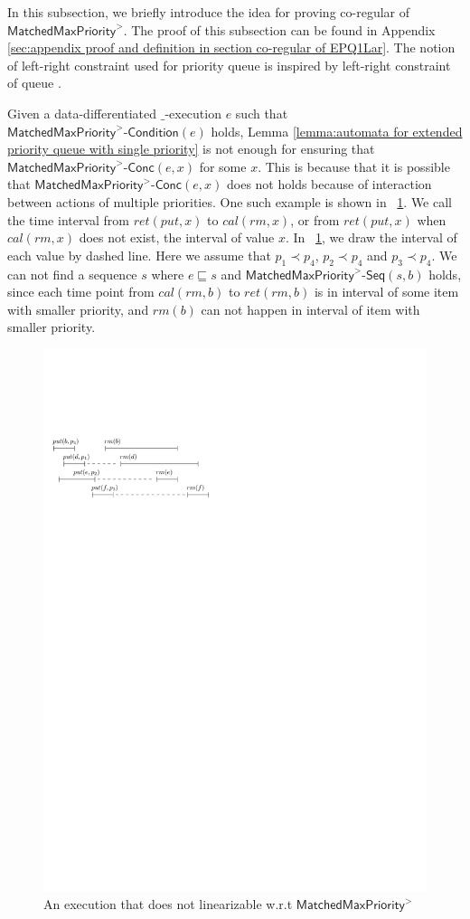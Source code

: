 In this subsection, we briefly introduce the idea for proving co-regular of $\mathsf{MatchedMaxPriority}^{>}$. The proof of this subsection can be found in Appendix \ref{sec:appendix proof and definition in section co-regular of EPQ1Lar}. The notion of left-right constraint used for priority queue is inspired by left-right constraint of queue \cite{Bouajjani:2015}.

Given a data-differentiated $\_$-execution $e$ such that $\mathsf{MatchedMaxPriority}^{>}\mathsf{\text{-}Condition}(e)$ holds, Lemma \ref{lemma:automata for extended priority queue with single priority} is not enough for ensuring that $\mathsf{MatchedMaxPriority}^{>}\mathsf{\text{-}Conc}(e,x)$ for some $x$. This is because that it is possible that $\mathsf{MatchedMaxPriority}^{>}\mathsf{\text{-}Conc}(e,x)$ does not holds because of interaction between actions of multiple priorities. One such example is shown in \figurename~\ref{fig:introduce gap for EPQ1Lar}. We call the time interval from $\textit{ret}(\textit{put},x)$ to $\textit{cal}(rm,x)$, or from $\textit{ret}(\textit{put},x)$ when $\textit{cal}(rm,x)$ does not exist, the interval of value $x$. In \figurename~\ref{fig:introduce gap for EPQ1Lar}, we draw the interval of each value by dashed line. Here we assume that $p_1 \prec p_4$, $p_2 \prec p_4$ and $p_3 \prec p_4$. We can not find a sequence $s$ where $e \sqsubseteq s$ and $\mathsf{MatchedMaxPriority}^{>}\mathsf{\text{-}Seq}(s,b)$ holds, since each time point from $\textit{cal}(\textit{rm},b)$ to $\textit{ret}(\textit{rm},b)$ is in interval of some item with smaller priority, and $\textit{rm}(b)$ can not happen in interval of item with smaller priority. 

\begin{figure}[htbp]
  \centering
  \includegraphics[width=0.4 \textwidth]{figures/PIC-HIS-INTRO-GAP-EPQ1L.pdf}
  \caption{An execution that does not linearizable w.r.t $\mathsf{MatchedMaxPriority}^{>}$}
  \label{fig:introduce gap for EPQ1Lar}
\end{figure}


